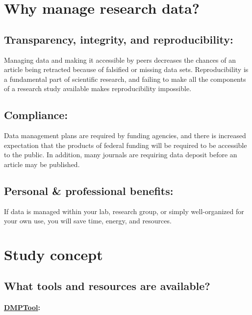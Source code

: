 \documentclass{tufte-handout}
\begin{document}
\section{Why manage research data?}\label{why-manage-research-data}

\subsection{Transparency, integrity, and reproducibility:}\label{transparency-integrity-and-reproducibility}

Managing data and making it accessible by peers decreases the chances of
an article being retracted because of falsified or missing data sets.
Reproducibility is a fundamental part of scientific research, and
failing to make all the components of a research study available makes
reproducibility impossible.

\subsection{Compliance:}\label{compliance}

Data management plans are required by funding agencies, and there is
increased expectation that the products of federal funding will be
required to be accessible to the public. In addition, many journals are
requiring data deposit before an article may be published.

\subsection{Personal \& professional benefits:}\label{personal-professional-benefits}

If data is managed within your lab, research group, or simply
well-organized for your own use, you will save time, energy, and
resources.

\section{Study concept}\label{study-concept}

\subsection{What tools and resources are
available?}\label{what-tools-and-resources-are-available}

\paragraph{\href{https://dmp.cdlib.org/}{DMPTool}:}\label{dmptool}
\end{document}
